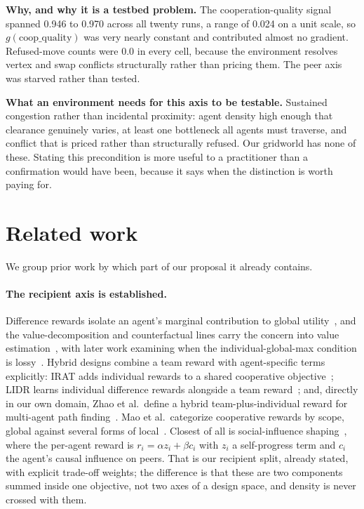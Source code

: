 \documentclass[11pt]{article}
\begin{document}
\textbf{Why, and why it is a testbed problem.} The cooperation-quality signal spanned 0.946 to 0.970 across all twenty runs, a range of 0.024 on a unit scale, so $g(\text{coop\_quality})$ was very nearly constant and contributed almost no gradient. Refused-move counts were 0.0 in every cell, because the environment resolves vertex and swap conflicts structurally rather than pricing them. The peer axis was starved rather than tested.

\textbf{What an environment needs for this axis to be testable.} Sustained congestion rather than incidental proximity: agent density high enough that clearance genuinely varies, at least one bottleneck all agents must traverse, and conflict that is priced rather than structurally refused. Our gridworld has none of these. Stating this precondition is more useful to a practitioner than a confirmation would have been, because it says when the distinction is worth paying for.

\section{Related work}\label{sec:related}
We group prior work by which part of our proposal it already contains.

\paragraph{The recipient axis is established.} Difference rewards isolate an agent's marginal contribution to global utility~\cite{coin}, and the value-decomposition and counterfactual lines carry the concern into value estimation~\cite{vdn,qmix,qtran,coma}, with later work examining when the individual-global-max condition is lossy~\cite{igm}. Hybrid designs combine a team reward with agent-specific terms explicitly: IRAT adds individual rewards to a shared cooperative objective~\cite{irat}; LIDR learns individual difference rewards alongside a team reward~\cite{lidr}; and, directly in our own domain, Zhao et al.\ define a hybrid team-plus-individual reward for multi-agent path finding~\cite{hybridmapf}. Mao et al.\ categorize cooperative rewards by scope, global against several forms of local~\cite{rdcoop}. Closest of all is social-influence shaping~\cite{jaques}, where the per-agent reward is $r_i = \alpha z_i + \beta c_i$ with $z_i$ a self-progress term and $c_i$ the agent's causal influence on peers. That is our recipient split, already stated, with explicit trade-off weights; the difference is that these are two components summed inside one objective, not two axes of a design space, and density is never crossed with them.
\end{document}
